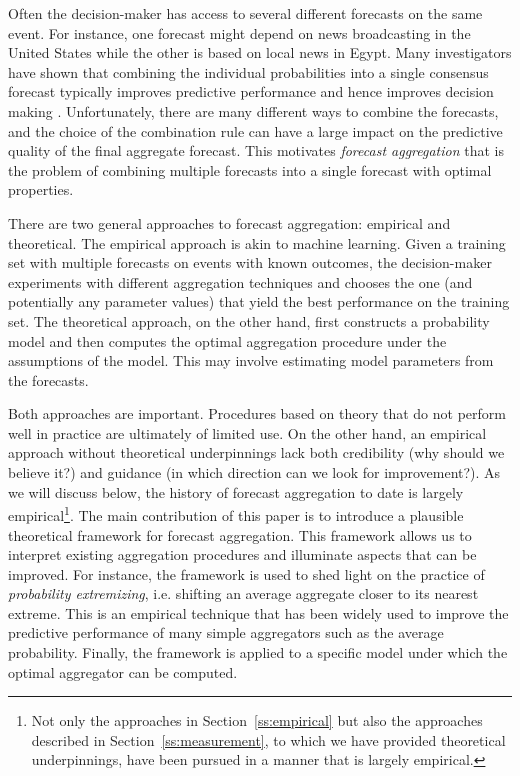 \documentclass[11pt]{article}
\theoremstyle{definition}
\theoremstyle{definition}
\begin{document}
Often the decision-maker has access to several different
forecasts on the same event. For instance, one forecast might depend on news broadcasting in the United States while the other
is based on local news in Egypt. Many investigators have shown that combining the individual probabilities into a single consensus forecast typically improves predictive performance and hence improves decision making \citep{clemen1989combining,
armstrong2001combining}. Unfortunately, there are many different ways to combine the forecasts, and the choice of the combination
rule can have a large impact on the predictive quality of the final
aggregate forecast.  
This motivates \textit{forecast aggregation} that
is the problem of combining multiple forecasts into a single
forecast with optimal properties.

There are two general approaches to forecast aggregation: empirical
and theoretical.  The empirical approach is akin to machine
learning. Given a training set with multiple forecasts on events with
known outcomes, the decision-maker experiments with different
aggregation techniques and chooses the one (and potentially any
parameter values) that yield the best performance on the training set.
The theoretical approach, on the other hand, first constructs a
probability model and then computes the optimal aggregation procedure
under the assumptions of the model.  This may involve estimating model
parameters from the forecasts.

Both approaches are important.  Procedures based on theory that do not
perform well in practice are ultimately of limited use.  On the other
hand, an empirical approach without theoretical underpinnings lack
both credibility (why should we believe it?)  and guidance (in which
direction can we look for improvement?).  As we will discuss below,
the history of forecast aggregation to date is largely
empirical\footnote{Not only the approaches in
Section~\ref{ss:empirical} but also the approaches described in
Section~\ref{ss:measurement}, to which we have provided theoretical
underpinnings, have been pursued in a manner that is largely
empirical.}.  The main contribution of this paper is to introduce a plausible
theoretical framework for forecast aggregation.  This framework allows
us to interpret existing aggregation procedures and illuminate aspects
that can be improved. For instance, the
framework is used to shed light on the practice of {\em probability
extremizing}, i.e. shifting an average aggregate closer to its nearest
extreme. This is an empirical technique that has been widely used to
improve the predictive performance of many simple aggregators such as
the average probability. Finally, the framework is applied to a
specific model under which the optimal aggregator can be computed.
\end{document}
